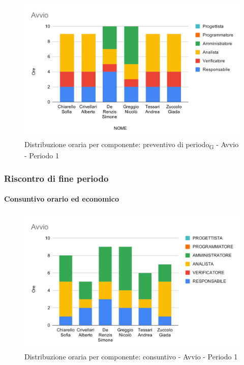 \begin{figure}[H]
	\centering
	\includegraphics[scale=2]{res/images/charts/preventivo/avvio.png}
	\caption{Distribuzione oraria per componente: preventivo di periodo\textsubscript{G} - Avvio - Periodo 1}
\end{figure}

\subsubsection{Riscontro di fine periodo}

\paragraph{Consuntivo orario ed economico}
\subparagraph*{}

\contabilitaTable{
	
}

\begin{figure}[H]
	\centering
	\includegraphics[scale=2]{res/images/charts/consuntivo/avvio.png}
	\caption{Distribuzione oraria per componente: consuntivo - Avvio - Periodo 1}
\end{figure}

